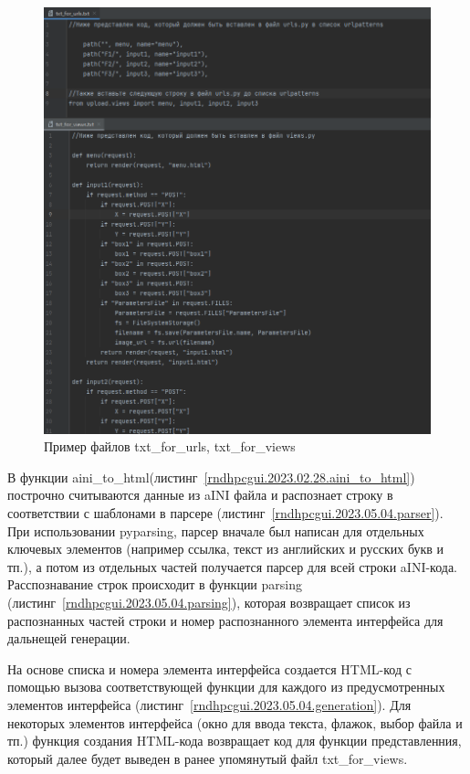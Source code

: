 \begin{figure}[!ht]
    \centering
    \includegraphics[scale=0.7]{ResearchNotes/rndhpc_dev_gui_2023_05_04/rndhpcgui.2023.05.04.picture1.png}
    \caption{Пример файлов txt_for_urls, txt_for_views}
    \label{rndhpcgui.2023.05.04.picture1}
\end{figure}


В функции \textsf{aini_to_html}(листинг~\ref{rndhpcgui.2023.02.28.aini_to_html}) построчно считываются данные из \textsf{aINI} файла и распознает строку в соответствии с шаблонами в парсере (листинг~\ref{rndhpcgui.2023.05.04.parser}). При использовании pyparsing, парсер вначале был написан для отдельных ключевых элементов (например ссылка, текст из английских и русских букв и тп.), а потом из отдельных частей получается парсер для всей строки \textsf{aINI}-кода. Расспознавание строк происходит в функции parsing (листинг~\ref{rndhpcgui.2023.05.04.parsing}), которая возвращает список из распознанных частей строки и номер распознанного элемента интерфейса для дальнещей генерации.


На основе списка и номера элемента интерфейса создается \textsf{HTML}-код с помощью вызова соответствующей функции для каждого из предусмотренных элементов интерфейса (листинг~\ref{rndhpcgui.2023.05.04.generation}). Для некоторых элементов интерфейса (окно для ввода текста, флажок, выбор файла и тп.) функция создания \textsf{HTML}-кода возвращает код для функции представленния, который далее будет выведен в ранее упомянутый файл \textsf{txt_for_views}.

